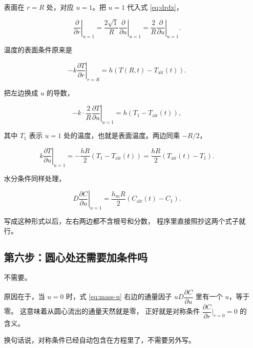 表面在 $r=R$ 处，对应 $u=1$。把 $u=1$ 代入式 \eqref{eq:drdx}，

\begin{equation}
\left.\frac{\partial}{\partial r}\right|_{u=1}
= \frac{2\sqrt{1}}{R}\left.\frac{\partial}{\partial u}\right|_{u=1}
= \frac{2}{R}\left.\frac{\partial}{\partial u}\right|_{u=1}.
\end{equation}

温度的表面条件原来是

\begin{equation}
-k\left.\frac{\partial T}{\partial r}\right|_{r=R}
= h\left(T(R,t)-T_{\mathrm{air}}(t)\right).
\end{equation}

把左边换成 $u$ 的导数，

\begin{equation}
-k\cdot\frac{2}{R}\left.\frac{\partial T}{\partial u}\right|_{u=1}
= h\left(T_1-T_{\mathrm{air}}(t)\right),
\end{equation}

其中 $T_1$ 表示 $u=1$ 处的温度，也就是表面温度。两边同乘 $-R/2$，

\begin{equation}
k\left.\frac{\partial T}{\partial u}\right|_{u=1}
= -\frac{hR}{2}\left(T_1-T_{\mathrm{air}}(t)\right)
= \frac{hR}{2}\left(T_{\mathrm{air}}(t)-T_1\right).
\label{eq:bcu-T}
\end{equation}

水分条件同样处理，

\begin{equation}
D\left.\frac{\partial C}{\partial u}\right|_{u=1}
= \frac{h_mR}{2}\left(C_{\mathrm{air}}(t)-C_1\right).
\label{eq:bcu-C}
\end{equation}

写成这种形式以后，左右两边都不含根号和分数，
程序里直接照抄这两个式子就行。

\subsection{第六步：圆心处还需要加条件吗}

不需要。

原因在于，当 $u=0$ 时，式 \eqref{eq:mass-u} 右边的通量因子
$uD\dfrac{\partial C}{\partial u}$ 里有一个 $u$，等于零。
这意味着从圆心流出的通量天然就是零，
正好就是对称条件 $\dfrac{\partial C}{\partial r}\big|_{r=0}=0$ 的含义。

换句话说，对称条件已经自动包含在方程里了，不需要另外写。

